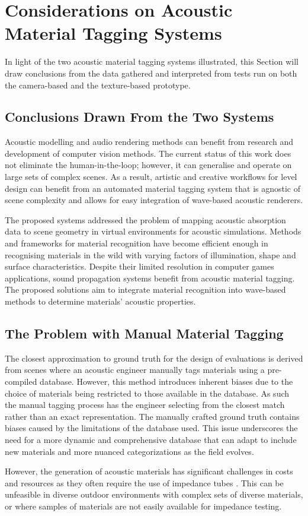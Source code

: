 \section{Considerations on Acoustic Material Tagging Systems}
In light of the two acoustic material tagging systems illustrated, this Section will draw conclusions from the data gathered and interpreted from tests run on both the camera-based and the texture-based prototype.

\subsection{Conclusions  Drawn From the Two Systems}
Acoustic modelling and audio rendering methods can benefit from research and development of computer vision methods. 
The current status of this work does not eliminate the human-in-the-loop; however, it can generalise and operate on large sets of complex scenes. As a result, artistic and creative workflows for level design can benefit from an automated material tagging system that is agnostic of scene complexity and allows for easy integration of wave-based acoustic renderers.

The proposed systems addressed the problem of mapping acoustic absorption data to scene geometry in virtual environments for acoustic simulations. Methods and frameworks for material recognition have become efficient enough in recognising materials in the wild with varying factors of illumination, shape and surface characteristics. Despite their limited resolution in computer games applications, sound propagation systems benefit from acoustic material tagging. The proposed solutions aim to integrate material recognition into wave-based methods to determine materials' acoustic properties.


\subsection{The Problem with Manual Material Tagging}
The closest approximation to ground truth for the design of evaluations is derived from scenes where an acoustic engineer manually tags materials using a pre-compiled database. However, this method introduces inherent biases due to the choice of materials being restricted to those available in the database. As such the manual tagging process has the engineer selecting from the closest match rather than an exact representation. The manually crafted ground truth contains biases caused by the limitations of the database used. This issue underscores the need for a more dynamic and comprehensive database that can adapt to include new materials and more nuanced categorizations as the field evolves.\par
However, the generation of acoustic materials has significant challenges in costs and resources as they often require the use of impedance tubes \citep{jones1997comparison}. This can be unfeasible in diverse outdoor environments with complex sets of diverse materials, or where samples of materials are not easily available for impedance testing.

